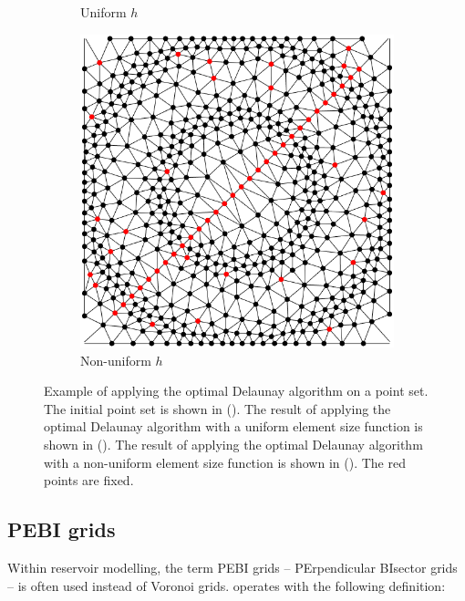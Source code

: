 \begin{figure}[ht]
\begin{subfigure}[b]{0.32\textwidth}
        \caption{Uniform $h$}
        \label{fig:ODT-after}
    \end{subfigure}
    \begin{subfigure}[b]{0.32\textwidth}
        \centering
        \includegraphics[width=\textwidth]{report/Images/Theory/optimal-delaunay/demo_distmesh_fancy.png}
        \caption{Non-uniform $h$}
        \label{fig:ODT-fancy}
    \end{subfigure}
    \caption[Example of applying the optimal Delaunay algorithm on a point set]{Example of applying the optimal Delaunay algorithm on a point set. The initial point set is shown in (). The result of applying the optimal Delaunay algorithm with a uniform element size function is shown in (). The result of applying the optimal Delaunay algorithm with a non-uniform element size function is shown in (). The red points are fixed.}
    \label{fig:optimal-delaunay}
\end{figure}

\subsection{PEBI grids}
Within reservoir modelling, the term PEBI grids -- PErpendicular BIsector grids -- is often used instead of Voronoi grids. \textcite{UPR_thesis} operates with the following definition:

